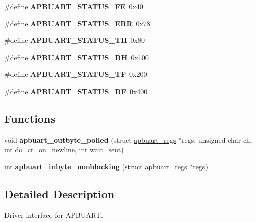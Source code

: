 \begin{DoxyCompactItemize}
\mbox{\label{group__uart_gaeb5cd207332bf2abefa996a69375813b}} 
\#define {\bfseries A\+P\+B\+U\+A\+R\+T\+\_\+\+S\+T\+A\+T\+U\+S\+\_\+\+FE}~0x40
\item 
\mbox{\label{group__uart_gafddddb5e1282ea76c3f4c622c82f529f}} 
\#define {\bfseries A\+P\+B\+U\+A\+R\+T\+\_\+\+S\+T\+A\+T\+U\+S\+\_\+\+E\+RR}~0x78
\item 
\mbox{\label{group__uart_gad4a130e643bc19cd27faf54d683acde8}} 
\#define {\bfseries A\+P\+B\+U\+A\+R\+T\+\_\+\+S\+T\+A\+T\+U\+S\+\_\+\+TH}~0x80
\item 
\mbox{\label{group__uart_gacfe6dee6c962f042346d76ca40784510}} 
\#define {\bfseries A\+P\+B\+U\+A\+R\+T\+\_\+\+S\+T\+A\+T\+U\+S\+\_\+\+RH}~0x100
\item 
\mbox{\label{group__uart_ga64993621337496f42bf3420bf0949a2d}} 
\#define {\bfseries A\+P\+B\+U\+A\+R\+T\+\_\+\+S\+T\+A\+T\+U\+S\+\_\+\+TF}~0x200
\item 
\mbox{\label{group__uart_gafccb6eef2e25db40615284e2223302be}} 
\#define {\bfseries A\+P\+B\+U\+A\+R\+T\+\_\+\+S\+T\+A\+T\+U\+S\+\_\+\+RF}~0x400
\end{DoxyCompactItemize}
\subsection*{Functions}
\begin{DoxyCompactItemize}
\item 
\mbox{\label{group__uart_ga6e5cd9b855949d6f78c3b3fc081ecaf7}} 
void {\bfseries apbuart\+\_\+outbyte\+\_\+polled} (struct \mbox{\hyperlink{structapbuart__regs}{apbuart\+\_\+regs}} $\ast$regs, unsigned char ch, int do\+\_\+cr\+\_\+on\+\_\+newline, int wait\+\_\+sent)
\item 
\mbox{\label{group__uart_gaa95e03ec69d11ef5123f7dc0953953fd}} 
int {\bfseries apbuart\+\_\+inbyte\+\_\+nonblocking} (struct \mbox{\hyperlink{structapbuart__regs}{apbuart\+\_\+regs}} $\ast$regs)
\end{DoxyCompactItemize}


\subsection{Detailed Description}
Driver interface for A\+P\+B\+U\+A\+RT. 

